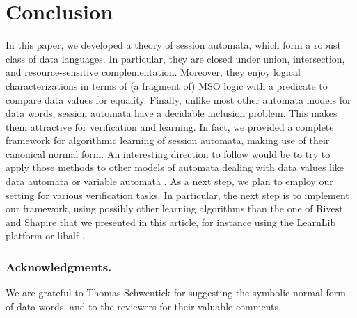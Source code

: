\documentclass{LMCS}
\begin{document}
\section{Conclusion}

In this paper, we developed a theory of session automata, which
form a robust class of data languages. In particular, they are closed under
union, intersection, and resource-sensitive complementation. Moreover, they
enjoy logical characterizations in terms of (a fragment of) MSO logic with
a predicate to compare data values for equality. Finally, unlike most other
automata models for data words, session automata have a decidable inclusion
problem. This makes them attractive for verification and learning.
In fact, we provided a complete framework for algorithmic learning of
session automata, making use of their canonical normal form. An
interesting direction to follow would be to try to apply those methods
to other models of automata dealing with data values like data
automata \cite{BojanczykDMSS11,Bjorklund10} or variable automata
\cite{DBLP:conf/lata/GrumbergKS10}.  As a next step, we plan to employ
our setting for various verification tasks. In particular, the next
step is to implement our framework, using possibly other learning
algorithms than the one of Rivest and Shapire that we presented in
this article, for instance using the LearnLib platform \cite{MRSL07}
or libalf \cite{BKKLNP10}.

\subsubsection*{Acknowledgments.} We are grateful to Thomas Schwentick
for suggesting the symbolic normal form of data words, and to the reviewers
for their valuable comments.
\end{document}
